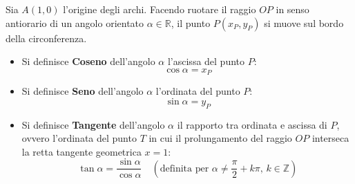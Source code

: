 \documentclass[11pt,a4paper,oneside]{report}
\begin{document}
Sia $A(1, 0)$ l'origine degli archi. Facendo ruotare il raggio $OP$ in senso antiorario di un angolo orientato $\alpha \in \mathbb{R}$, il punto $P(x_P, y_P)$ si muove sul bordo della circonferenza.
\begin{itemize}
    \item Si definisce \textbf{Coseno} dell'angolo $\alpha$ l'ascissa del punto $P$:
    \begin{equation}
        \cos\alpha = x_P
    \end{equation}
    \item Si definisce \textbf{Seno} dell'angolo $\alpha$ l'ordinata del punto $P$:
    \begin{equation}
        \sin\alpha = y_P
    \end{equation}
    \item Si definisce \textbf{Tangente} dell'angolo $\alpha$ il rapporto tra ordinata e ascissa di $P$, ovvero l'ordinata del punto $T$ in cui il prolungamento del raggio $OP$ interseca la retta tangente geometrica $x = 1$:
    \begin{equation}
        \tan\alpha = \frac{\sin\alpha}{\cos\alpha} \quad \left(\text{definita per } \alpha \neq \frac{\pi}{2} + k\pi, \, k \in \mathbb{Z}\right)
    \end{equation}
\end{itemize}
\end{document}
